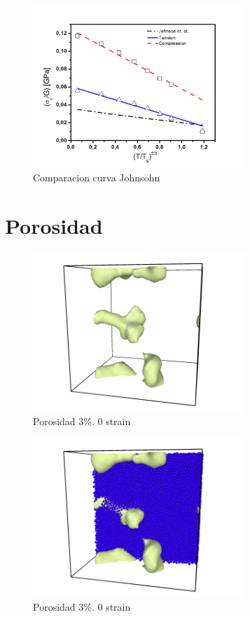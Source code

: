 \documentclass[10pt, oneside]{article} %
\begin{document}
\begin{figure}[H]
\centering
\includegraphics[width=8cm]{Figures/Fit2_Tercios.png}
\caption{Comparacion curva Johnsohn}
\end{figure}


\section{Porosidad}

\begin{figure}[H]
\centering
\includegraphics[width=8cm]{Figures/5_0strain.png}
\caption{Porosidad 3\%. 0 strain}
\end{figure}

\begin{figure}[H]
\centering
\includegraphics[width=8cm]{Figures/5_0strain_color.png}
\caption{Porosidad 3\%. 0 strain}
\end{figure}
\end{document}
